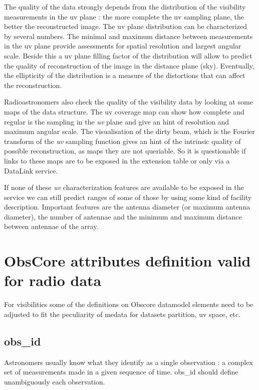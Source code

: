\documentclass[11pt,a4paper]{ivoa}
\begin{document}
The quality of the data strongly depends from the distribution of the visibility measurements 
in the uv plane : the more complete the uv sampling plane, the better the reconstructed image. 
The uv plane distribution can be characterized by several numbers. 
The minimal and maximum distance between measurements in the uv plane provide assessments for 
spatial resolution and largest angular scale. 
Beside this a uv plane filling factor of the distribution will allow to predict the quality 
of reconstruction of the image in the distance plane (sky).
Eventually, the ellipticity of the distribution is a measure of the distortions that can 
affect the reconstruction.

Radioastronomers also check the quality of the visibility data by looking at some maps of 
the data structure. The uv coverage map can show how complete and regular is the sampling in 
the \emph{uv} plane and give an hint of resolution and maximum angular scale. 
The visualisation of the dirty beam, which is the Fourier transform of the \emph{uv} sampling 
function gives an hint of the intrinsic quality of possible reconstruction, as maps they are 
not queriable. So it is questionable if links to these maps are to be exposed in the extension 
table or only via a DataLink service. 

If none of these \emph{uv} characterization features are available to be exposed in the service 
we can still predict ranges of some of those by using some kind of facility description.  
Important features are the antenna diameter (or maximum antenna diameter), the number of 
antennae and the minimum and maximum distance between antennae of the array.

\section{ObsCore attributes definition valid for radio data}
\label{sec:ObsCoreRadDef}

For visibilities some of the definitions on Obscore datamodel elements need to be adjusted 
to fit the peculiarity of medata for datasets partition, uv space, etc.

\subsection{obs\_id}

Astronomers usually know what they identify as a single observation : a complex set of 
measurements made in a given sequence of time. obs\_id should define unambiguously each 
observation.
\end{document}
